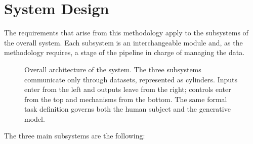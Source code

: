 \documentclass[12pt]{report}
\begin{document}
\section{System Design}
The requirements that arise from this methodology apply to the subsystems of the overall system. Each subsystem is an interchangeable module and, as the methodology requires, a stage of the pipeline in charge of managing the data.
\begin{figure}[htbp]
    \centering
    \resizebox{\linewidth}{!}{%
        
    }
    \caption{Overall architecture of the system. The three subsystems communicate only through datasets, represented as cylinders. Inputs enter from the left and outputs leave from the right; controls enter from the top and mechanisms from the bottom. The same formal task definition governs both the human subject and the generative model.}
    \label{fig:system_overview}
\end{figure}
The three main subsystems are the following:
\end{document}
